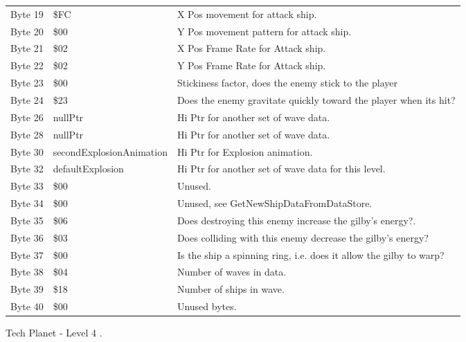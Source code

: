\begin{figure}[H]
{\begin{adjustbox}{width=12cm}
\begin{tabular}{lll}
 Byte 19 & \$FC                      & X Pos movement for attack ship.                                    \\
 Byte 20 & \$00                      & Y Pos movement pattern for attack ship.                            \\
 Byte 21 & \$02                      & X Pos Frame Rate for Attack ship.                                  \\
 Byte 22 & \$02                      & Y Pos Frame Rate for Attack ship.                                  \\
 Byte 23 & \$00                      & Stickiness factor, does the enemy stick to the player              \\
 Byte 24 & \$23                      & Does the enemy gravitate quickly toward the player when its hit?   \\
 Byte 26 & nullPtr                  & Hi Ptr for another set of wave data.                               \\
 Byte 28 & nullPtr                  & Hi Ptr for another set of wave data.                               \\
 Byte 30 & secondExplosionAnimation & Hi Ptr for Explosion animation.                                    \\
 Byte 32 & defaultExplosion         & Hi Ptr for another set of wave data for this level.                \\
 Byte 33 & \$00                      & Unused.                                                            \\
 Byte 34 & \$00                      & Unused, see GetNewShipDataFromDataStore.                           \\
 Byte 35 & \$06                      & Does destroying this enemy increase the gilby's energy?.           \\
 Byte 36 & \$03                      & Does colliding with this enemy decrease the gilby's energy?        \\
 Byte 37 & \$00                      & Is the ship a spinning ring, i.e. does it allow the gilby to warp? \\
 Byte 38 & \$04                      & Number of waves in data.                                           \\
 Byte 39 & \$18                      & Number of ships in wave.                                           \\
 Byte 40 & \$00                      & Unused bytes.                                                      \\
\bottomrule
\end{tabular}

  \end{adjustbox}

  }\caption*{Tech Planet - Level 4
.}
\end{figure}


